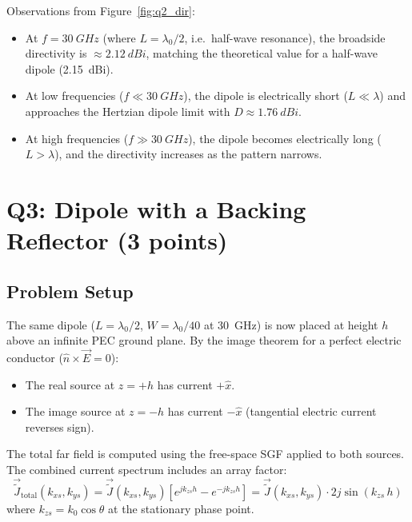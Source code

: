 \documentclass{article}
\begin{document}
Observations from Figure~\ref{fig:q2_dir}:
\begin{itemize}
\item At $f=\SI{30}{GHz}$ (where $L=\lambda_0/2$, i.e.\ half-wave resonance), the broadside directivity is $\approx\SI{2.12}{dBi}$, matching the theoretical value for a half-wave dipole (\SI{2.15}{dBi}).
\item At low frequencies ($f\ll\SI{30}{GHz}$), the dipole is electrically short ($L\ll\lambda$) and approaches the Hertzian dipole limit with $D\approx\SI{1.76}{dBi}$.
\item At high frequencies ($f\gg\SI{30}{GHz}$), the dipole becomes electrically long ($L>\lambda$), and the directivity increases as the pattern narrows.
\end{itemize}

\section{Q3: Dipole with a Backing Reflector (3 points)}

\subsection{Problem Setup}

The same dipole ($L=\lambda_0/2$, $W=\lambda_0/40$ at \SI{30}{GHz}) is now placed at height $h$ above an infinite PEC ground plane. By the image theorem for a perfect electric conductor ($\hat{n}\times\vec{E}=0$):

\begin{itemize}
\item The real source at $z=+h$ has current $+\hat{x}$.
\item The image source at $z=-h$ has current $-\hat{x}$ (tangential electric current reverses sign).
\end{itemize}

The total far field is computed using the free-space SGF applied to both sources. The combined current spectrum includes an array factor:
\begin{equation}\label{eq:arrayfactor}
\vec{\tilde{J}}_{\text{total}}(k_{xs},k_{ys}) = \vec{\tilde{J}}(k_{xs},k_{ys})\left[e^{jk_{zs}h}-e^{-jk_{zs}h}\right]
= \vec{\tilde{J}}(k_{xs},k_{ys})\cdot 2j\sin(k_{zs}\,h)
\end{equation}
where $k_{zs}=k_0\cos\theta$ at the stationary phase point.
\end{document}
